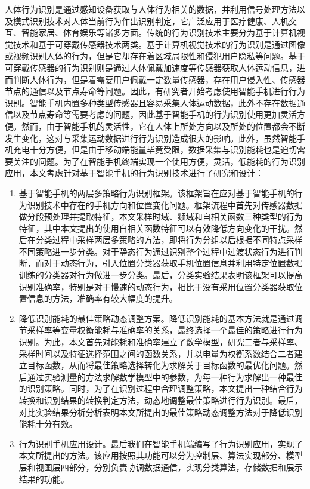﻿
\begin{cnabstract}

\par 人体行为识别是通过感知设备获取与人体行为相关的数据，并利用信号处理方法以及模式识别技术对人体当前行为作出识别判定，它广泛应用于医疗健康、人机交互、智能家居、体育娱乐等诸多方面。传统的行为识别技术主要分为基于计算机视觉技术和基于可穿戴传感器技术两类。基于计算机视觉技术的行为识别是通过图像或视频识别人体的行为，但是它却存在着区域局限性和侵犯用户隐私等问题。基于可穿戴传感器的行为识别则是通过人体佩戴加速度等传感器获取人体运动信息，进而判断人体行为，但是着需要用户佩戴一定数量传感器，存在用户侵入性、传感器节点的通信以及节点寿命等问题。因此，有研究者开始考虑使用智能手机进行行为识别。智能手机内置多种类型传感器且容易采集人体运动数据，此外不存在数据通信以及节点寿命等需要考虑的问题，因此基于智能手机的行为识别使用更加灵活方便。然而，由于智能手机的灵活性，它在人体上所处方向以及所处的位置都会不断发生变化，这对与采集运动数据进行行为识别造成很大的影响。此外，虽然智能手机充电十分方便，但是由于移动端能量毕竟受限，数据采集与识别能耗也是迫切需要关注的问题。为了在智能手机终端实现一个使用方便，灵活，低能耗的行为识别应用，本文考虑针对基于智能手机的行为识别技术进行了研究和设计：
\begin{enumerate}
	\item 基于智能手机的两层多策略行为识别框架。该框架旨在应对基于智能手机的行为识别技术中存在的手机方向和位置变化问题。框架流程中首先对传感器数据做分段预处理并提取特征，本文采样时域、频域和自相关函数三种类型的行为特征，其中本文提出的使用自相关函数特征可以有效降低方向变化的干扰。然后在分类过程中采样两层多策略的方法，即将行为分组以后根据不同特点采样不同策略进一步分类。对于静态行为通过识别整个过程中过渡状态行为进行判断，而对于动态行为，引入位置分类器获取手机位置信息并利用特定位置数据训练的分类器对行为做进一步分类。最后，分类实验结果表明该框架可以提高识别准确率，特别是对于慢速的动态行为，相比于没有采用位置分类器获取位置信息的方法，准确率有较大幅度的提升。
	\item 降低识别能耗的最佳策略动态调整方案。降低识别能耗的基本方法就是通过调节采样率等变量权衡能耗与准确率的关系，最终选择一个最佳的策略进行行为识别。为此，本文首先对能耗和准确率建立了数学模型，研究二者与采样率、采样时间以及特征选择范围之间的函数关系，并以电量为权衡系数结合二者建立目标函数，从而将最佳策略选择转化为求解关于目标函数的最优化问题。然后通过实验测量的方法求解数学模型中的参数，为每一种行为求解出一种最佳的识别策略。同时，为了在识别过程中合理调整策略，本文提出一种结合行为转换和识别结果的转换判定方法，动态地调整最佳策略进行行为识别。最后，对比实验结果分析分析表明本文所提出的最佳策略动态调整方法对于降低识别能耗十分有效。
	\item 行为识别手机应用设计。最后我们在智能手机端编写了行为识别应用，实现了本文所提出的方法。该应用按照其功能可以分为控制层、算法实现部分、模型层和视图层四部分，分别负责协调数据通信，实现分类算法，存储数据和展示结果的功能。
\end{enumerate}

\end{cnabstract}

